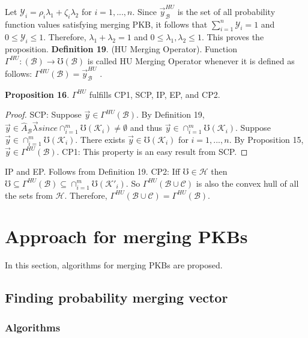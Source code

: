 \documentclass[]{iosart2c}
\begin{document}
  Let $\mathcal{Y}_i = \rho_i\lambda_1 + \zeta_i\lambda_2$ for $i = 1, ... , n$. Since $\vec{y}^{HU}_\mathcal{B}$
  is the set of all probability function values satisfying
  merging PKB, it follows that $\sum^n_{i=1} \mathcal{Y}_i = 1$ and $0 \le
  \mathcal{Y}_i \le 1$. Therefore, $\lambda_1 + \lambda_2 = 1$ and $0 \le \lambda_1, \lambda_2 \le 1$.
  This proves the proposition.
  \textbf{Definition 19}. (HU Merging Operator). Function
  $\Gamma^{HU} : (\mathcal{B}) \to \mho(\mathcal{B})$ is called HU Merging Operator
  whenever it is defined as follows: $\Gamma^{HU}(\mathcal{B}) = \vec{y}^{HU}_\mathcal{B}$ .

  \textbf{Proposition 16}. $\Gamma^{HU}$ fulfills CP1, SCP, IP, EP, and CP2.

  \begin{proof}
    SCP: Suppose $\vec{y}  \in \Gamma^{HU}(\mathcal{B})$. By Definition
    19, $\vec{y} \in \widehat{A}_\mathcal{B}\vec{\lambda} since \cap^m_{i=1}\mho(\mathcal{K}_i) \neq \emptyset$ and thus $\vec{y} \in
    \cap^m_{i=1}\mho(\mathcal{K}_i)$. Suppose $\vec{y} \in \cap^m_{i=1}\mho(\mathcal{K}_i)$. There exists
    $\vec{y} \in \mho(\mathcal{K}_i)$ for $i = 1, ... , n$. By Proposition 15, $\vec{y} \in
    \Gamma^{HU}(\mathcal{B})$. CP1: This property is an easy result from
    SCP.
  \end{proof}

  IP and EP. Follows from Definition 19. CP2: Iff $\mho \in
  \mathcal{H}$ then $\mho \subseteq \Gamma^{HU}(\mathcal{B}) \subseteq \cap^m_{i=1}\mho(\mathcal{K}'_i)$. So $\Gamma^{HU}(\mathcal{B} \cup \mathcal{C})$
  is also the convex hull of all the sets from $\mathcal{H}$. Therefore,
  $\Gamma^{HU}(\mathcal{B} \cup \mathcal{C}) = \Gamma^{HU}(\mathcal{B})$.


  \section{Approach for merging PKBs}

  In this section, algorithms for merging PKBs are proposed.

  \subsection{Finding probability merging vector}

  \subsubsection{Algorithms}
\end{document}
